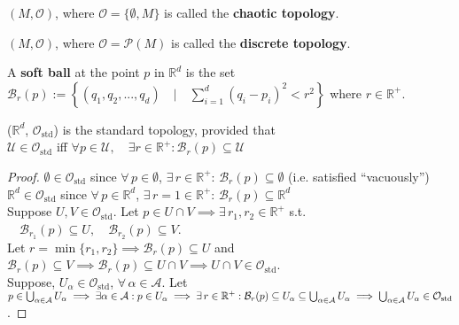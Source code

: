 \begin{definition}
  $(M , \mathcal{O})$, where $\mathcal{O} = \lbrace \emptyset, M\rbrace$ is called the \textbf{chaotic topology}.
\end{definition}

\begin{definition}
  $(M , \mathcal{O})$, where $\mathcal{O} = \mathcal{P}(M)$ is called the \textbf{discrete topology}.
\end{definition}

\begin{definition}
A \textbf{soft ball} at the point $p$ in $\mathbb{R}^d$ is the set\\
$\mathcal{B}_r(p) := \left\{ (q_1, q_2, ..., q_d) \quad | \quad \displaystyle\sum_{i=1}^{d} (q_i - p_i)^2 < r^2 \right\}$ where $r \in \mathbb{R}^+$.
\end{definition}

\begin{definition}
  ($\mathbb{R}^d$, $\mathcal{O}_{\text{std}}$) is the standard topology, provided that \\
  $\mathcal{U} \in \mathcal{O}_{\text{std}}$ iff $\forall p \in \mathcal{U}, \quad \exists r \in \mathbb{R}^+: \mathcal{B}_r(p) \subseteq \mathcal{U}$
\end{definition}

\begin{proof}
  $\emptyset \in \mathcal{O}_{\text{std}}$ since $\forall \, p \in \emptyset$, $\exists \, r \in \mathbb{R}^+$: $\mathcal{B}_r(p) \subseteq \emptyset$ (i.e. satisfied ``vacuously'') \\
$\mathbb{R}^d \in \mathcal{O}_{\text{std}}$ since $\forall \, p \in \mathbb{R}^d$, $\exists \, r = 1 \in \mathbb{R}^+$: $\mathcal{B}_r(p) \subseteq \mathbb{R}^d$ \\
 
Suppose $U, V \in \mathcal{O}_{\text{std}}$. Let $p \in U \cap V \implies \exists \, r_1, r_2 \in \mathbb{R}^+$ s.t. $\quad \mathcal{B}_{r_1}(p) \subseteq U, \quad \mathcal{B}_{r_2}(p) \subseteq V$. \\
Let $r=\min{ \lbrace r_1, r_2 \rbrace} \implies \mathcal{B}_r(p) \subseteq U$ and $\mathcal{B}_r(p) \subseteq V \implies \mathcal{B}_r(p) \subseteq U \cap V \implies U \cap V \in \mathcal{O}_{\text{std}}$.   \\

Suppose, $U_{\alpha} \in \mathcal{O}_{\text{std}}$, $\forall \, \alpha \in \mathcal{A}$. Let $p \in \bigcup_{\alpha \in \mathcal{A}} U_{\alpha} \implies \exists \alpha \in \mathcal{A}: p \in U_{\alpha}  \\
\implies \exists \, r \in \mathbb{R}^+ : \mathcal{B}_{r}(p) \subseteq U_{\alpha} \subseteq \bigcup_{\alpha \in \mathcal{A}} U_{\alpha} \implies \bigcup_{\alpha \in \mathcal{A}} U_{\alpha} \in \mathcal{O}_{\text{std}}$.  
\end{proof}

